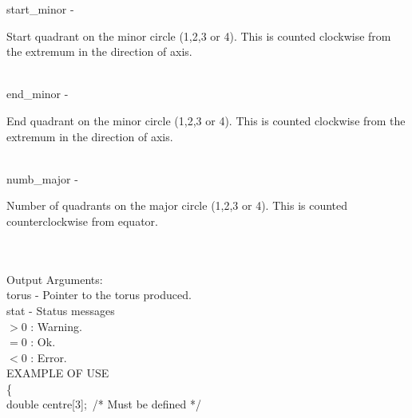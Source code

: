         \>\>    {\fov start\_minor}  \> - \> \begin{minipg2}
                                               Start quadrant on the
                                               minor circle (1,2,3 or 4).
                                               This is counted clockwise
                                               from the extremum in the
                                               direction of axis.
                                             \end{minipg2}\\[0.8ex]
        \>\>    {\fov end\_minor}    \> - \> \begin{minipg2}
                                               End quadrant on the minor
                                               circle (1,2,3 or 4). This
                                               is counted clockwise from
                                               the extremum in the
                                               direction of axis.
                                             \end{minipg2}\\[0.8ex]
        \>\>    {\fov numb\_major}   \> - \> \begin{minipg2}
                                               Number of quadrants on
                                               the major circle (1,2,3
                                               or 4). This is counted
                                               counterclockwise from
                                               equator.
                                             \end{minipg2}\\[0.8ex]
\\
        \>Output Arguments:\\
        \>\>    {\fov torus} \> - \> Pointer to the torus produced.\\
        \>\>    {\fov stat}     \> - \> Status messages\\
                \>\>\>\>\>              $> 0$   : Warning.\\
                \>\>\>\>\>              $= 0$   : Ok.\\
                \>\>\>\>\>              $< 0$   : Error.\\
\newpagetabs
EXAMPLE OF USE\\
        \>      \{ \\
        \>\>    double \> {\fov centre}[3]; \,/* Must be defined */\\
